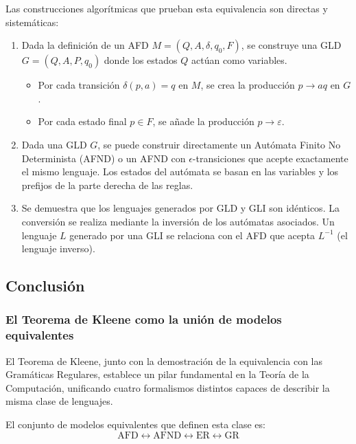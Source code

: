 Las construcciones algorítmicas que prueban esta equivalencia son directas y sistemáticas:

\begin{enumerate}
    \item {} Dada la definición de un AFD $M=(Q, A, \delta, q_0, F)$, se construye una GLD $G=(Q, A, P, q_0)$ donde los estados $Q$ actúan como variables.
    \begin{itemize}
        \item Por cada transición $\delta(p, a) = q$ en $M$, se crea la producción $p \to aq$ en $G$.
        \item Por cada estado final $p \in F$, se añade la producción $p \to \varepsilon$.
    \end{itemize}
    \item {} Dada una GLD $G$, se puede construir directamente un Autómata Finito No Determinista (AFND) o un AFND con $\epsilon$-transiciones que acepte exactamente el mismo lenguaje. Los estados del autómata se basan en las variables y los prefijos de la parte derecha de las reglas.
    \item {} Se demuestra que los lenguajes generados por GLD y GLI son idénticos. La conversión se realiza mediante la inversión de los autómatas asociados. Un lenguaje $L$ generado por una GLI se relaciona con el AFD que acepta $L^{-1}$ (el lenguaje inverso).
\end{enumerate}

\subsection{Conclusión} %

\subsubsection{El Teorema de Kleene como la unión de modelos equivalentes}

El Teorema de Kleene, junto con la demostración de la equivalencia con las Gramáticas Regulares, establece un pilar fundamental en la Teoría de la Computación, unificando cuatro formalismos distintos capaces de describir la misma clase de lenguajes.

El conjunto de modelos equivalentes que definen esta clase es:
$$ \text{AFD} \leftrightarrow \text{AFND} \leftrightarrow \text{ER} \leftrightarrow \text{GR} $$

